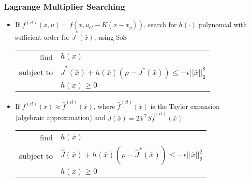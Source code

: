 \documentclass{beamer}
\begin{document}

\begin{frame}
\frametitle{Lagrange Multiplier Searching}
\begin{itemize}
\item If $f^{(cl)}(x,u)=f(x,u_G-K(x-x_g))$, search for $h(\cdot)$ polynomial with sufficient order for $\dot{J}^{\ast}(\bar{x})$, using SoS
\begin{center}
\begin{tabular}{ r l }
find & $h(\bar{x})$ \\
subject to & $\dot{J}^{\ast}(\bar{x})+ h(\bar{x})(\rho - J^{\ast}(\bar{x}))\leq -\epsilon ||\bar{x}||_2^2$\\
 & $h(\bar{x})\geq 0$
\end{tabular}
\end{center}\vspace{.2cm}
\item If $f^{(cl)}(x)\approx \hat{f}^{(cl)}(\bar{x})$, where $\hat{f}^{(cl)}(\bar{x})$ is the Taylor expansion (algebraic approximation) and $\hat{\dot{J}}(\bar{x})=2\bar{x}^{\intercal}S\hat{f}^{(cl)}(\bar{x})$
\begin{center}
\begin{tabular}{ r l }
find & $h(\bar{x})$ \\
subject to & $\dot{\hat{J}}(\bar{x})+ h(\bar{x})(\rho - \hat{J}^{\ast}(\bar{x}))\leq -\epsilon ||\bar{x}||_2^2$\\
 & $h(\bar{x})\geq 0$
\end{tabular}
\end{center}
\end{itemize}

\end{frame}

\end{document}
